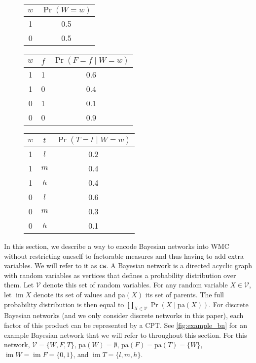 \documentclass[accepted]{uai2021}
\theoremstyle{definition}
\DeclareMathOperator{\im}{im}
\begin{document}
\begin{figure*}
  \centering
  \begin{subfigure}{0.2\textwidth}
    \centering
  \end{subfigure}%
  \begin{subfigure}{0.8\textwidth}
    \centering
    \begin{tabular}[t]{cc}
      \toprule
      $w$ & $\Pr(W = w)$ \\
      \midrule
      1 & 0.5 \\
      0 & 0.5 \\
      \bottomrule
    \end{tabular}
    \begin{tabular}[t]{ccc}
      \toprule
      $w$ & $f$ & $\Pr(F = f \mid W = w)$ \\
      \midrule
      1 & 1 & 0.6 \\
      1 & 0 & 0.4 \\
      0 & 1 & 0.1 \\
      0 & 0 & 0.9 \\
      \bottomrule
    \end{tabular}
    \begin{tabular}[t]{ccc}
      \toprule
      $w$ & $t$ & $\Pr(T = t \mid W = w)$ \\
      \midrule
      1 & $l$ & 0.2 \\
      1 & $m$ & 0.4 \\
      1 & $h$ & 0.4 \\
      0 & $l$ & 0.6 \\
      0 & $m$ & 0.3 \\
      0 & $h$ & 0.1 \\
      \bottomrule
    \end{tabular}
  \end{subfigure}
  \caption{An example Bayesian network with its CPTs.}
  \label{fig:example_bn}
\end{figure*}

In this section, we describe a way to encode Bayesian networks into WMC without
restricting oneself to factorable measures and thus having to add extra
variables. We will refer to it as \texttt{cw}. A Bayesian network is a directed
acyclic graph with random variables as vertices that defines a probability
distribution over them. Let $\mathcal{V}$ denote this set of random variables.
For any random variable $X \in \mathcal{V}$, let $\im X$ denote its set of
values and $\mathrm{pa}(X)$ its set of parents. The full probability
distribution is then equal to $\prod_{X \in \mathcal{V}} \Pr(X \mid
\mathrm{pa}(X))$. For discrete Bayesian networks (and we only consider discrete
networks in this paper), each factor of this product can be represented by a
CPT. See \cref{fig:example_bn} for an example Bayesian network that we will
refer to throughout this section. For this network, $\mathcal{V} = \{ W, F, T
\}$, $\mathrm{pa}(W) = \emptyset$, $\mathrm{pa}(F) = \mathrm{pa}(T) = \{ W \}$,
$\im W = \im F = \{0, 1 \}$, and $\im T = \{ l, m, h \}$.
\end{document}
